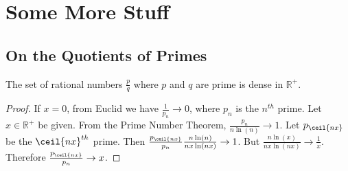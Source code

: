 \documentclass[crop=false,class=book]{standalone}
\begin{document}
\chapter{Some More Stuff}
\section{On the Quotients of Primes}
\begin{theorem}
The set of rational numbers $\frac{p}{q}$ where $p$ and $q$ are prime is dense in $\mathbb{R}^{+}$.
\end{theorem}
\begin{proof}
If $x=0$, from Euclid we have $\frac{1}{p_n}\rightarrow 0$, where $p_n$ is the $n^{th}$ prime. Let $x\in\mathbb{R}^{+}$ be given. From the Prime Number Theorem, $\frac{p_n}{n\ln(n)}\rightarrow 1$. Let $p_{\ceil{nx}}$ be the $\ceil{nx}^{th}$ prime. Then $\frac{p_{\ceil{nx}}}{p_n}\frac{n\ln(n)}{nx\ln(nx)}\rightarrow 1$. But $\frac{n\ln(x)}{nx\ln(nx)}\rightarrow \frac{1}{x}$. Therefore $\frac{p_{\ceil{nx}}}{p_n}\rightarrow x$.
\end{proof}
\end{document}
